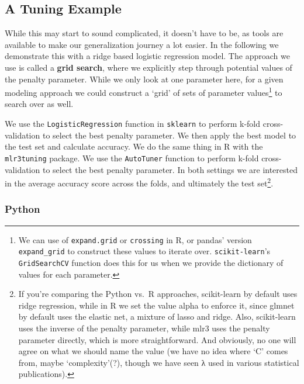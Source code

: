 \documentclass[
  letterpaper,
]{krantz}
\begin{document}
\subsection{A Tuning Example}\label{a-tuning-example}

While this may start to sound complicated, it doesn't have to be, as
tools are available to make our generalization journey a lot easier. In
the following we demonstrate this with a ridge based logistic regression
model. The approach we use is called a \textbf{grid search}, where we
explicitly step through potential values of the penalty parameter. While
we only look at one parameter here, for a given modeling approach we
could construct a `grid' of sets of parameter values\footnote{We can use
  of \texttt{expand.grid} or \texttt{crossing} in R, or pandas' version
  \texttt{expand\_grid} to construct these values to iterate over.
  \texttt{scikit-learn}'s \texttt{GridSearchCV} function does this for
  us when we provide the dictionary of values for each parameter.} to
search over as well.

We use the \texttt{LogisticRegression} function in \texttt{sklearn} to
perform k-fold cross-validation to select the best penalty parameter. We
then apply the best model to the test set and calculate accuracy. We do
the same thing in R with the \texttt{mlr3tuning} package. We use the
\texttt{AutoTuner} function to perform k-fold cross-validation to select
the best penalty parameter. In both settings we are interested in the
average accuracy score across the folds, and ultimately the test
set\footnote{If you're comparing the Python vs.~R approaches,
  scikit-learn by default uses ridge regression, while in R we set the
  value alpha to enforce it, since glmnet by default uses the elastic
  net, a mixture of lasso and ridge. Also, scikit-learn uses the inverse
  of the penalty parameter, while mlr3 uses the penalty parameter
  directly, which is more straightforward. And obviously, no one will
  agree on what we should name the value (we have no idea where `C'
  comes from, maybe `complexity'(?), though we have seen λ used in
  various statistical publications).}.

\subsubsection{Python}
\end{document}
